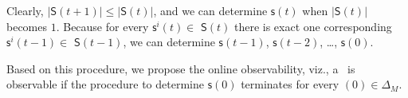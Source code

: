 Clearly, $|\mathsf{S}(t+1)|\le|\mathsf{S}(t)|$, and we can determine $\mathsf{s}(t)$  when $|\mathsf{S}(t)|$ becomes $1$. Because for every $\mathsf{s}^{i}(t)\in $ $\mathsf{S}(t)$ there is exact one corresponding $\mathsf{s}^{i}(t-1)\in $ $\mathsf{S}(t-1)$, we can determine $\mathsf{s}(t-1)$, $\mathsf{s}(t-2)$, \ldots, $\mathsf{s}(0)$.

Based on this procedure, we propose the online observability, viz., a \BCN\ is observable if the procedure to determine $\mathsf{s}(0)$ terminates for every \State$(0)\in \Delta_M$.  %







